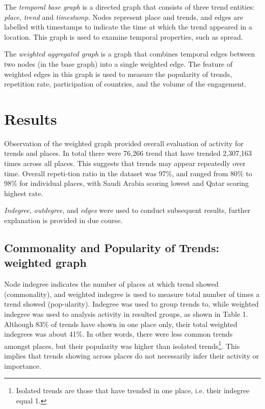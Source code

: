 \documentclass{llncs}
\begin{document}
The {\emph{temporal base graph}} is a directed graph that consists of
three trend entities: {\emph{place}}, {\emph{trend}} and
{\emph{timestamp}}. Nodes represent place and trends, and edges are
labelled with timestamps to indicate the time at which the trend
appeared in a location. This graph is used to examine temporal
properties, such as spread.

The {\emph{weighted aggregated graph}} is a graph that combines
temporal edges between two nodes (in the base graph) into a single
weighted edge. The feature of weighted edges in this graph is used to
measure the popularity of trends, repetition rate, participation of
countries, and the volume of the engagement.


\section{Results}\label{results}

Observation of the weighted graph provided overall evaluation of
activity for trends and places. In total there were 76,266 trend that
have trended 2,307,163 times across all places. This suggests that
trends may appear repeatedly over time. Overall repeti-tion ratio in
the dataset was 97\%, and ranged from 80\% to 98\% for individual
places, with Saudi Arabia scoring lowest and Qatar scoring highest
rate.

{\emph{Indegree}}, {\emph{outdegree}}, and {\emph{edges}} were used to
conduct subsequent results, further explanation is provided in due
course.


\subsection{Commonality and Popularity of Trends: weighted graph}

Node indegree indicates the number of places at which trend showed
(commonality), and weighted indegree is used to measure total number
of times a trend showed (pop-ularity). Indegree was used to group
trends to, while weighted indegree was used to analysis activity in
resulted groups, as shown in Table 1. Although 83\% of trends have
shown in one place only, their total weighted indegrees was about
41\%. In other words, there were less common trends amongst places,
but their popularity was higher than isolated trends\footnote{Isolated
trends are those that have trended in one place, i.e. their indegree
equal 1.}. This implies that trends showing across places do not
necessarily infer their activity or importance.
\end{document}
